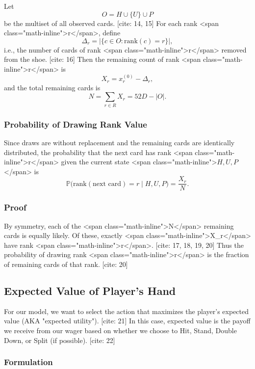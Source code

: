 \documentclass[12pt,a4paper]{cibb}
\begin{document}
Let
\[
  O = H \cup \{U\} \cup P
\]
be the multiset of all observed cards. [cite: 14, 15]
For each rank <span class="math-inline">r</span>, define
\[
  \Delta_r = \bigl|\{c \in O : \mathrm{rank}(c)=r\}\bigr|,
\]
i.e., the number of cards of rank <span class="math-inline">r</span> removed from the shoe. [cite: 16]
Then the remaining count of rank <span class="math-inline">r</span> is
\[
  X_r = x_r^{(0)} - \Delta_r,
\]
and the total remaining cards is
\[
  N = \sum_{r\in R} X_r = 52D - |O|.
\]

\subsubsection{Probability of Drawing Rank Value}

Since draws are without replacement and the remaining cards are identically distributed, the probability that the next card has rank <span class="math-inline">r</span> given the current state <span class="math-inline">\(H,U,P\)</span> is
\[
  \mathbb{P}\bigl(\mathrm{rank}(\text{next card}) = r \mid H, U, P\bigr)
  = \frac{X_r}{N}.
\]

\subsubsection{Proof}

By symmetry, each of the <span class="math-inline">N</span> remaining cards is equally likely.  Of these, exactly <span class="math-inline">X\_r</span> have rank <span class="math-inline">r</span>. [cite: 17, 18, 19, 20]
Thus the probability of drawing rank <span class="math-inline">r</span> is the fraction of remaining cards of that rank. [cite: 20]

\subsection{Expected Value of Player's Hand}
\label{sec:Expected Value}
For our model, we want to select the action that maximizes the player's expected value (AKA "expected utility"). [cite: 21]
In this case, expected value is the payoff we receive from our wager based on whether we choose to Hit, Stand, Double Down, or Split (if possible). [cite: 22]

\subsubsection{Formulation}
\end{document}
